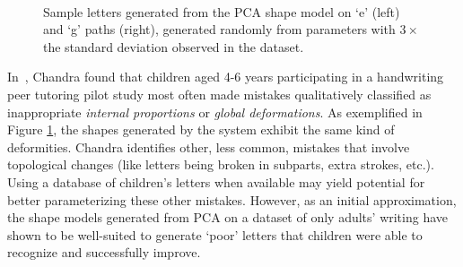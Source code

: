\documentclass{sig-alternate}
\begin{document}
\begin{figure}[thpb]
\centering
{}
~~~~~
\caption[Sample letters generated from the PCA shape model on `e' and `g'
paths.]{\label{fig:sampleLetters}Sample letters generated from the PCA shape
model on `e' (left) and `g' paths (right), generated randomly from
parameters with $3\times$ the standard deviation observed in the dataset.}

\end{figure}

In~\cite{Chandra2013}, Chandra found that children aged 4-6 years participating
in a handwriting peer tutoring pilot study most often made mistakes
qualitatively classified as inappropriate \emph{internal proportions} or
\emph{global deformations}. As exemplified in Figure \ref{fig:sampleLetters},
the shapes generated by the system exhibit the same kind of deformities. Chandra
identifies other, less common, mistakes that involve topological changes (like
letters being broken in subparts, extra strokes, etc.). Using a database of
children's letters when available may yield potential for better parameterizing
these other mistakes. However, as an initial approximation, the shape models
generated from PCA on a dataset of only adults' writing have shown to be
well-suited to generate `poor' letters that children were able to recognize and
successfully improve.
\end{document}
